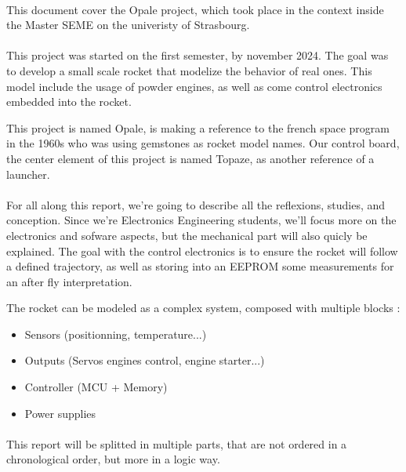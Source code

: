 \paragraph{}
This document cover the Opale project, which took place in the context inside
the Master SEME on the univeristy of Strasbourg.

\paragraph{}
This project was started on the first semester, by november 2024. The goal was
to develop a small scale rocket that modelize the behavior of real ones. This
model include the usage of powder engines, as well as come control electronics
embedded into the rocket.

This project is named Opale, is making a reference to the french space program
in the 1960s who was using gemstones as rocket model names.
Our control board, the center element of this project is named Topaze, as another
reference of a launcher.

\paragraph{}
For all along this report, we're going to describe all the reflexions, studies,
and conception. Since we're Electronics Engineering students, we'll focus more
on the electronics and sofware aspects, but the mechanical part will also
quicly be explained. The goal with the control electronics is to ensure the
rocket will follow a defined trajectory, as well as storing into an EEPROM some
measurements for an after fly interpretation.

The rocket can be modeled as a complex system, composed with multiple blocks :

\begin{itemize}[noitemsep]
    \item   Sensors (positionning, temperature...)
    \item   Outputs (Servos engines control, engine starter...)
    \item   Controller (MCU + Memory)
    \item   Power supplies
\end{itemize}

\paragraph{}
This report will be splitted in multiple parts, that are not ordered in a
chronological order, but more in a logic way.

